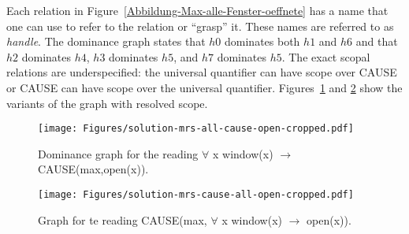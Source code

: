 Each relation in Figure~\ref{Abbildung-Max-alle-Fenster-oeffnete} has a name that one can use to refer to the relation or ``grasp'' it.
These names are referred to as \emph{handle}. The dominance graph states that $h0$ dominates both $h1$ and $h6$ and that
$h2$ dominates $h4$, $h3$ dominates $h5$, and $h7$ dominates $h5$. The exact scopal relations are underspecified: the universal quantifier can have scope over
CAUSE or CAUSE can have scope over the universal quantifier. Figures~\ref{fig-alle-cause} and
\ref{fig-cause-alle} show the variants of the graph with resolved scope.
\begin{figure}
\centering

\texttt{[image: Figures/solution-mrs-all-cause-open-cropped.pdf]}
\caption{Dominance graph for the reading $\forall$ x window(x) $\to$ CAUSE(max,open(x)).\label{fig-alle-cause}}
\end{figure}%
\begin{figure}
\centering

\texttt{[image: Figures/solution-mrs-cause-all-open-cropped.pdf]}
\caption{Graph for te reading CAUSE(max, $\forall$ x window(x) $\to$ open(x)).\label{fig-cause-alle}}
\end{figure}%
